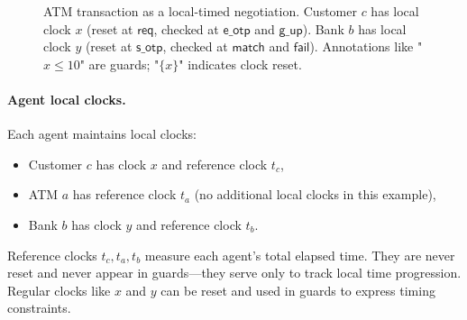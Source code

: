\begin{figure}[t]
\caption{ATM transaction as a local-timed negotiation. Customer $c$ has local clock $x$ (reset at $\mathsf{req}$, checked at $\mathsf{e\_otp}$ and $\mathsf{g\_up}$). Bank $b$ has local clock $y$ (reset at $\mathsf{s\_otp}$, checked at $\mathsf{match}$ and $\mathsf{fail}$). Annotations like "$x \leq 10$" are guards; "$\{x\}$" indicates clock reset.}
\label{fig:ATM}
\end{figure}

\paragraph{Agent local clocks.} Each agent maintains local clocks:
\begin{itemize}
\item Customer $c$ has clock $x$ and reference clock $t_c$,
\item ATM $a$ has reference clock $t_a$ (no additional local clocks in this example),
\item Bank $b$ has clock $y$ and reference clock $t_b$.
\end{itemize}

Reference clocks $t_c, t_a, t_b$ measure each agent's total elapsed time. They are never reset and never appear in guards—they serve only to track local time progression. Regular clocks like $x$ and $y$ can be reset and used in guards to express timing constraints.

